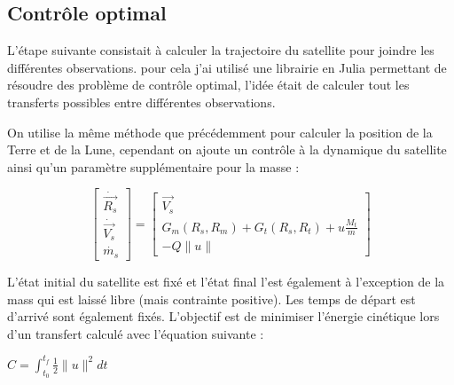 \documentclass[12pt]{article} %
\begin{document}
		\subsection{Contrôle optimal}
		
		L'étape suivante consistait à calculer la trajectoire du satellite pour joindre les différentes observations.
		pour cela j'ai utilisé une librairie en Julia permettant de résoudre des problème de contrôle optimal, l'idée était de calculer tout les transferts possibles entre différentes observations.
		
		On utilise la même méthode que précédemment pour calculer la position de la Terre et de la Lune, cependant on ajoute un contrôle à la dynamique du satellite ainsi qu'un paramètre supplémentaire pour la masse :
		
		$$
		\begin{bmatrix}
			\dot{\overrightarrow{R_{s}}}\\
			\dot{\overrightarrow{V_{s}}}\\
			\dot{m_{s}}
		\end{bmatrix} =\begin{bmatrix}
			\overrightarrow{V_{s}}\\
			G_{m}(R_s,R_m)+G_{t}(R_s,R_t)+u\frac{M_{t}}{m}\\
			-Q\|u\|
		\end{bmatrix}
		$$
		
		L'état initial du satellite est fixé et l'état final l'est également à l'exception de la mass qui est laissé libre (mais contrainte positive). Les temps de départ est d'arrivé sont également fixés.
		L'objectif est de minimiser l'énergie cinétique lors d'un transfert calculé avec l'équation suivante :
		
		$C=\int_{t_0}^{t_f}\frac{1}{2}\|u\|^2dt$
		
\end{document}
